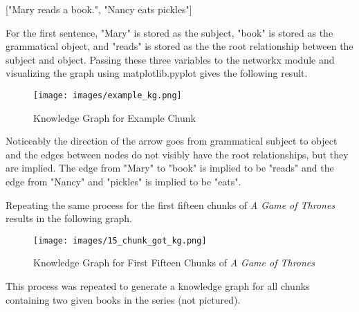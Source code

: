 \begin{center}
["Mary reads a book.", "Nancy eats pickles"]
\end{center}
\bigskip

For the first sentence, "Mary" is stored as the subject, "book" is stored as the grammatical object, and "reads" is stored as the the root relationship between the subject and object. Passing these three variables to the networkx module and visualizing the graph using matplotlib.pyplot gives the following result.

\begin{figure}[h]
    \centering
    \texttt{[image: images/example\_kg.png]}
    \caption{Knowledge Graph for Example Chunk}
    \label{fig:enter-label}
\end{figure}

Noticeably the direction of the arrow goes from grammatical subject to object and the edges between nodes do not visibly have the root relationships, but they are implied. The edge from "Mary" to "book" is implied to be "reads" and the edge from "Nancy" and "pickles" is implied to be "eats".

\newpage

Repeating the same process for the first fifteen chunks of \textit{A Game of Thrones} results in the following graph.

\begin{figure}[h]
    \centering
    \texttt{[image: images/15\_chunk\_got\_kg.png]}
    \caption{Knowledge Graph for First Fifteen Chunks of \textit{A Game of Thrones}}
    \label{fig:enter-label}
\end{figure} \par

This process was repeated to generate a knowledge graph for all chunks containing two given books in the series (not pictured).

\bigskip